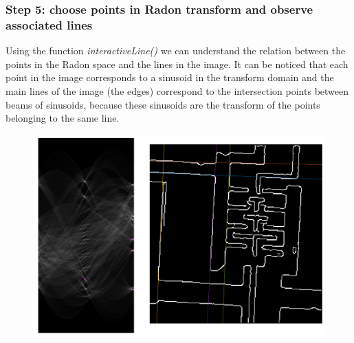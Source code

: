\documentclass[12pt,a4paper,oneside,final,titlepage,openany,onecolumn]{article}
\begin{document}
		\subsubsection*{Step 5: choose points in Radon transform and observe associated lines}
		\par
		Using the function \textit{interactiveLine()} we can understand the relation between the points in the Radon space and the lines in the image.
		It can be noticed that each point in the image corresponds to a sinusoid in the transform domain and the main lines of the image (the edges) correspond to the intersection points between beams of sinusoids, because these sinusoids are the transform of the points belonging to the same line.
		\begin{figure}[H]
			\includegraphics[width=\linewidth]{images/interactive_lines.png}
		\end{figure}
		
\end{document}
